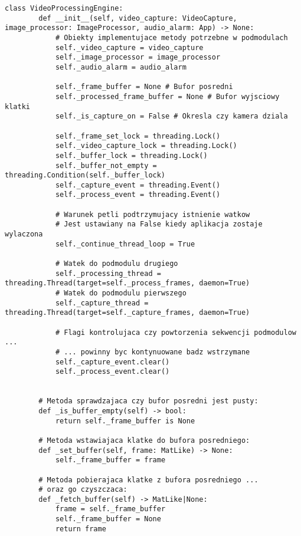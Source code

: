 \begin{lstlisting}[caption={Kod modułu silnika przetwarzania wideo z zawartymi mechanizami synchronizacji}, label={lst:engine-1}]
    class VideoProcessingEngine:
        def __init__(self, video_capture: VideoCapture, image_processor: ImageProcessor, audio_alarm: App) -> None:
            # Obiekty implementujace metody potrzebne w podmodulach
            self._video_capture = video_capture
            self._image_processor = image_processor
            self._audio_alarm = audio_alarm
    
            self._frame_buffer = None # Bufor posredni
            self._processed_frame_buffer = None # Bufor wyjsciowy klatki
            self._is_capture_on = False # Okresla czy kamera dziala
    
            self._frame_set_lock = threading.Lock()
            self._video_capture_lock = threading.Lock()
            self._buffer_lock = threading.Lock()
            self._buffer_not_empty = threading.Condition(self._buffer_lock)
            self._capture_event = threading.Event()
            self._process_event = threading.Event()
    
            # Warunek petli podtrzymujacy istnienie watkow 
            # Jest ustawiany na False kiedy aplikacja zostaje wylaczona
            self._continue_thread_loop = True
    
            # Watek do podmodulu drugiego
            self._processing_thread = threading.Thread(target=self._process_frames, daemon=True)
            # Watek do podmodulu pierwszego
            self._capture_thread = threading.Thread(target=self._capture_frames, daemon=True)
    
            # Flagi kontrolujaca czy powtorzenia sekwencji podmodulow ... 
            # ... powinny byc kontynuowane badz wstrzymane
            self._capture_event.clear()
            self._process_event.clear()
    
    
        # Metoda sprawdzajaca czy bufor posredni jest pusty:
        def _is_buffer_empty(self) -> bool:
            return self._frame_buffer is None 
        
        # Metoda wstawiajaca klatke do bufora posredniego:
        def _set_buffer(self, frame: MatLike) -> None:
            self._frame_buffer = frame
        
        # Metoda pobierajaca klatke z bufora posredniego ... 
        # oraz go czyszczaca:
        def _fetch_buffer(self) -> MatLike|None:
            frame = self._frame_buffer
            self._frame_buffer = None
            return frame
    

\end{lstlisting}
